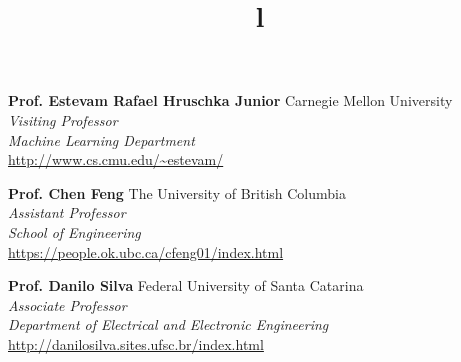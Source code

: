 \documentclass[margin, line]{res}
\begin{document}
\begin{resume}
\textbf{Prof. Estevam Rafael Hruschka Junior} \hfill Carnegie Mellon University\\
{\sl Visiting Professor}\\
{\sl Machine Learning Department}\\
\url{http://www.cs.cmu.edu/~estevam/}

\textbf{Prof. Chen Feng} \hfill The University of British Columbia\\
{\sl Assistant Professor}\\
{\sl School of Engineering}\\
\url{https://people.ok.ubc.ca/cfeng01/index.html}

\textbf{Prof. Danilo Silva} \hfill Federal University of Santa Catarina\\
{\sl Associate Professor}\\
{\sl Department of Electrical and Electronic Engineering}\\
\url{http://danilosilva.sites.ufsc.br/index.html}

\begin{format}
\title{l}\\
\\
\body\\
\end{format}

\end{resume}
\(\)
\end{document}
